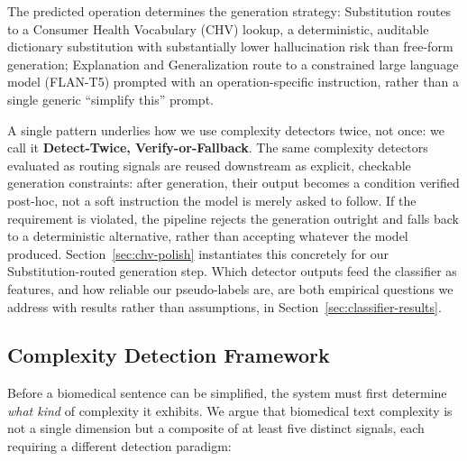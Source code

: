 \documentclass[11pt]{article}
\begin{document}
The predicted operation determines the generation strategy: Substitution
routes to a Consumer Health Vocabulary (CHV) lookup, a deterministic,
auditable dictionary substitution with substantially lower hallucination risk
than free-form generation; Explanation and Generalization route to a
constrained large language model (FLAN-T5) prompted with an operation-specific
instruction, rather than a single generic ``simplify this'' prompt.

A single pattern underlies how we use complexity detectors twice, not once:
we call it \textbf{Detect-Twice, Verify-or-Fallback}. The same complexity
detectors evaluated as routing signals are reused downstream as explicit,
checkable generation constraints: after generation, their output becomes a
condition verified post-hoc, not a soft instruction the model is merely
asked to follow. If the requirement is violated, the pipeline rejects the
generation outright and falls back to a deterministic alternative, rather
than accepting whatever the model produced.
Section~\ref{sec:chv-polish} instantiates this concretely for our
Substitution-routed generation step. Which detector outputs feed the
classifier as features, and how reliable our pseudo-labels are, are both
empirical questions we address with results rather than assumptions, in
Section~\ref{sec:classifier-results}.

\subsection{Complexity Detection Framework}
\label{sec:complexity-detection}

Before a biomedical sentence can be simplified, the system must first determine
\emph{what kind} of complexity it exhibits. We argue that biomedical text
complexity is not a single dimension but a composite of at least five distinct
signals, each requiring a different detection paradigm:
\end{document}

